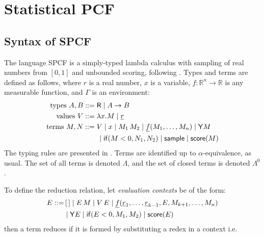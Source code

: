 \section{Statistical PCF}
\label{sec:SPCF}

\subsection{Syntax of SPCF}

The language SPCF is a simply-typed lambda calculus with sampling of real numbers from $[0,1]$ and unbounded scoring, following \cite{MakOPW21}. 
Types and terms are defined as follows, where $r$ is a real number, $x$ is a variable, $f : \mathbb{R}^n \to \mathbb{R}$ is any measurable function, and $\Gamma$ is an environment:
\begin{align*}
  \text{types } A, B &::= \textsf{R}  \mid  A \to B \\
  \text{values } V &::= \lambda x.M  \mid  \underline{r} \\
  \text{terms } M, N &::= V  \mid  x  \mid  M_1 \, M_2  \mid  \underline{f}(M_1,\dots ,M_n)  \mid  \mathsf{Y} M \\
   & \qquad \mid  \mathsf{if}(M < 0, N_1, N_2)  \mid  \mathsf{sample}  \mid  \mathsf{score}(M)
\end{align*}
The typing rules are presented in .
Terms are identified up to $\alpha$-equivalence, as usual. 
The set of all terms is denoted $\Lambda$, and the set of closed terms is denoted $\Lambda^0$.

To define the reduction relation, let \emph{evaluation contexts} be of the form:
\begin{align*}
  E ::= & \, [\,] \mid E \, M \mid V \, E \mid \underline{f}(\underline r_1,\dots ,\underline r_{k-1}, E, M_{k+1}, \dots, M_n) \\ & \mid \mathsf{Y} E \mid \mathsf{if}(E<0, M_1, M_2) \mid \mathsf{score} (E)
\end{align*}
then a term reduces if it is formed by substituting a redex in a context i.e.

